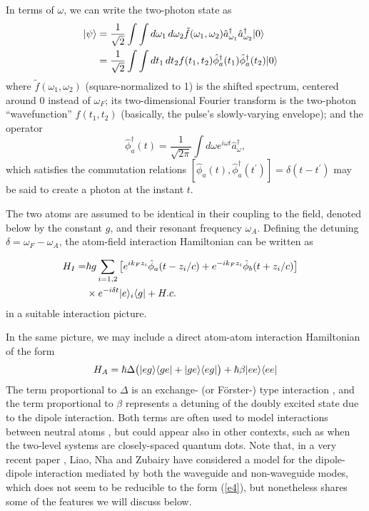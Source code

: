\documentclass[aps,pra,twocolumn,floatfix,superscriptaddress]{revtex4}
\begin{document}
In terms of $\omega$, we can write the two-photon state as
\begin{align}
|\psi\rangle &= \frac{1}{\sqrt{2}} \int \int d\omega_1\, d\omega_2 \tilde f(\omega_1,\omega_2) \hat a_{\omega_1}^\dagger \hat a_{\omega_2}^\dagger |0\rangle \cr
&= \frac{1}{\sqrt{2}} \int \int dt_1\, dt_2  f(t_1,t_2) \hat\phi_a^\dagger (t_1) \hat\phi_a^\dagger (t_2) |0\rangle
\end{align}
where $\tilde f(\omega_1,\omega_2)$ (square-normalized to 1) is the shifted spectrum, centered around $0$ instead of $\omega_F$;  its two-dimensional Fourier transform is the two-photon ``wavefunction'' $f(t_1,t_2)$ (basically, the pulse's slowly-varying envelope); and the operator 
\begin{equation}
\hat\phi_{a}^\dagger(t)= \frac{1}{\sqrt{2\pi}} \int d\omega e^{i\omega t} \hat a^\dagger_\omega,
\label{ne3}
\end{equation}
which satisfies the commutation relations $[\hat\phi_a(t),\hat\phi_{a}^\dagger(t^\prime)]= \delta(t-t^\prime)$ may be said to create a photon at the instant $t$.

The two atoms are assumed to be identical in their coupling to the field, denoted below by the constant $g$, and their resonant frequency $\omega_A$.  Defining the detuning $\delta = \omega_F-\omega_A$, the atom-field interaction Hamiltonian can be written as

\begin{align}
H_I = &\hbar g\sum_{i=1,2} \big[e^{ik_F z_i}\hat\phi_a(t-z_i/c) + e^{-ik_F z_i}\hat\phi_b(t+z_i/c) \big] \cr
&\times e^{-i\delta t}|e\rangle_i\langle g| + H.c.
\label{e3}
\end{align}
in a suitable interaction picture.





In the same picture, we may include a direct atom-atom interaction Hamiltonian of the form
\begin{equation}
H_A = \hbar\Delta \bigl(|eg\rangle\langle ge| + |ge\rangle\langle eg|\bigr) + \hbar\beta|ee\rangle\langle ee|
\label{e4}
\end{equation}
The term proportional to $\Delta$ is an exchange- (or F\"orster-) type interaction \cite{forster}, and the term proportional to $\beta$ represents a detuning of the doubly excited state due to the dipole interaction.  Both terms are often used to model interactions between neutral atoms \cite{deutsch, zubairy3, Draayer}, but could appear also in other contexts, such as when the two-level systems are closely-spaced quantum dots.  Note that, in a very recent paper \cite{interactions}, Liao, Nha and Zubairy have considered a model for the dipole-dipole interaction mediated by both the waveguide and non-waveguide modes, which does not seem to be reducible to the form (\ref{e4}), but nonetheless shares some of the features we will discuss below. 
\end{document}
